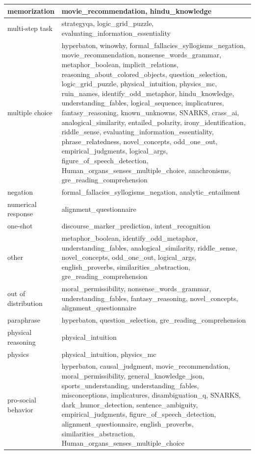 \documentclass[11pt, a4paper, logo, internal, copyright, nonumbering]{deepmind}
\begin{document}
\begin{xltabular}{\textwidth}{X|X}
memorization & movie\_recommendation, hindu\_knowledge \\ \hline
multi-step task & strategyqa, logic\_grid\_puzzle, evaluating\_information\_essentiality \\ \hline
multiple choice & hyperbaton, winowhy, formal\_fallacies\_syllogisms\_negation, movie\_recommendation, nonsense\_words\_grammar, metaphor\_boolean, implicit\_relations, reasoning\_about\_colored\_objects, question\_selection, logic\_grid\_puzzle, physical\_intuition, physics\_mc, ruin\_names, identify\_odd\_metaphor, hindu\_knowledge, understanding\_fables, logical\_sequence, implicatures, fantasy\_reasoning, known\_unknowns, SNARKS, crass\_ai, analogical\_similarity, entailed\_polarity, irony\_identification, riddle\_sense, evaluating\_information\_essentiality, phrase\_relatedness, novel\_concepts, odd\_one\_out, empirical\_judgments, logical\_args, figure\_of\_speech\_detection, Human\_organs\_senses\_multiple\_choice, anachronisms, gre\_reading\_comprehension \\ \hline
negation & formal\_fallacies\_syllogisms\_negation, analytic\_entailment \\ \hline
numerical response & alignment\_questionnaire \\ \hline
one-shot & discourse\_marker\_prediction, intent\_recognition \\ \hline
other & metaphor\_boolean, identify\_odd\_metaphor, understanding\_fables, analogical\_similarity, riddle\_sense, novel\_concepts, odd\_one\_out, logical\_args, english\_proverbs, similarities\_abstraction, gre\_reading\_comprehension \\ \hline
out of distribution & moral\_permissibility, nonsense\_words\_grammar, understanding\_fables, fantasy\_reasoning, novel\_concepts, alignment\_questionnaire \\ \hline
paraphrase & hyperbaton, question\_selection, gre\_reading\_comprehension \\ \hline
physical reasoning & physical\_intuition \\ \hline
physics & physical\_intuition, physics\_mc \\ \hline
pro-social behavior & hyperbaton, causal\_judgment, movie\_recommendation, moral\_permissibility, general\_knowledge\_json, sports\_understanding, understanding\_fables, misconceptions, implicatures, disambiguation\_q, SNARKS, dark\_humor\_detection, sentence\_ambiguity, empirical\_judgments, figure\_of\_speech\_detection, alignment\_questionnaire, english\_proverbs, similarities\_abstraction, Human\_organs\_senses\_multiple\_choice \\ \hline

\end{xltabular}
\end{document}
